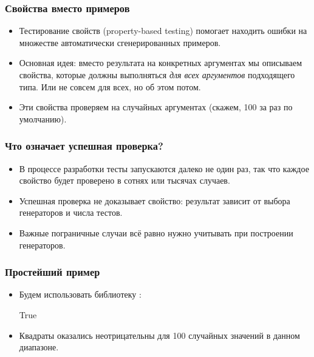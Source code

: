 \documentclass[11pt]{beamer}
\begin{document}
\begin{frame}[fragile]
  \frametitle{Свойства вместо примеров}
  \begin{itemize}
    \item Тестирование свойств (property-based testing) помогает находить ошибки на множестве автоматически сгенерированных примеров.
    \item Основная идея: вместо результата на конкретных аргументах мы описываем свойства, которые должны выполняться \emph{для всех аргументов} подходящего типа. \pause Или не совсем для всех, но об этом потом.
          \pause
    \item Эти свойства проверяем на случайных аргументах (скажем, 100 за раз по умолчанию).
  \end{itemize}
\end{frame}

\begin{frame}[fragile]
  \frametitle{Что означает успешная проверка?}
  \begin{itemize}
    \item В процессе разработки тесты запускаются далеко не один раз, так что каждое свойство будет проверено в сотнях или тысячах случаев.
          \pause
    \item Успешная проверка не доказывает свойство: результат зависит от выбора генераторов и числа тестов.
          \pause
    \item Важные пограничные случаи всё равно нужно учитывать при построении генераторов.
  \end{itemize}
\end{frame}

\begin{frame}[fragile]
  \frametitle{Простейший пример}
  \begin{itemize}
    \item Будем использовать библиотеку :
          \begin{ghci}
            True
          \end{ghci}
    \item Квадраты оказались неотрицательны для 100 случайных значений в данном диапазоне.
  \end{itemize}
\end{frame}
\end{document}
